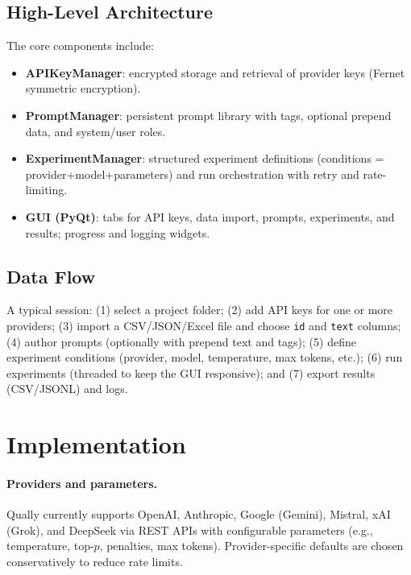\documentclass[11pt,a4paper]{article}
\begin{document}
\subsection{High-Level Architecture}
The core components include:
\begin{itemize}[leftmargin=*]
  \item \textbf{APIKeyManager}: encrypted storage and retrieval of provider keys (Fernet symmetric encryption).
  \item \textbf{PromptManager}: persistent prompt library with tags, optional prepend data, and system/user roles.
  \item \textbf{ExperimentManager}: structured experiment definitions (conditions = provider+model+parameters) and run orchestration with retry and rate-limiting.
  \item \textbf{GUI (PyQt)}: tabs for API keys, data import, prompts, experiments, and results; progress and logging widgets.
\end{itemize}


\subsection{Data Flow}
A typical session: (1) select a project folder; (2) add API keys for one or more providers; (3) import a CSV/JSON/Excel file and choose \texttt{id} and \texttt{text} columns; (4) author prompts (optionally with prepend text and tags); (5) define experiment conditions (provider, model, temperature, max tokens, etc.); (6) run experiments (threaded to keep the GUI responsive); and (7) export results (CSV/JSONL) and logs.

\section{Implementation}
\label{sec:implementation}
\paragraph{Providers and parameters.} Qually currently supports OpenAI, Anthropic, Google (Gemini), Mistral, xAI (Grok), and DeepSeek via REST APIs with configurable parameters (e.g., temperature, top-$p$, penalties, max tokens). Provider-specific defaults are chosen conservatively to reduce rate limits.
\end{document}
